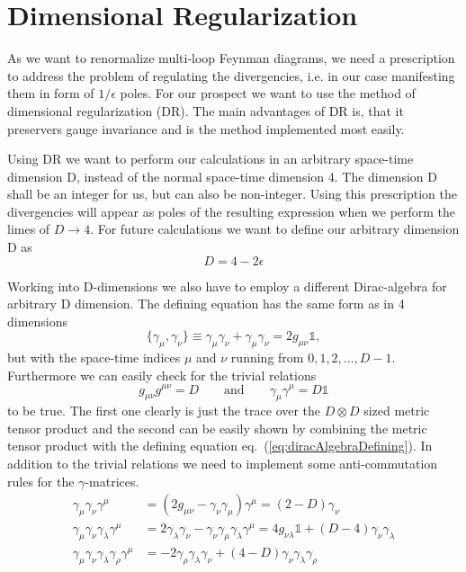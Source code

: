\section{Dimensional Regularization}
As we want to renormalize multi-loop Feynman diagrams, we need a prescription to address the problem of regulating the divergencies, i.e. in our case manifesting them in form of $1/\epsilon$ poles. For our prospect we want to use the method of dimensional regularization (DR). The main advantages of DR is, that it preservers gauge invariance and is the method implemented most easily. 
\par
Using DR we want to perform our calculations in an arbitrary space-time dimension D, instead of the normal space-time dimension 4. The dimension D shall be an integer for us, but can also be non-integer. Using this prescription the divergencies will appear as poles of the resulting expression when we perform the limes of $D \rightarrow 4$. For future calculations we want to define our arbitrary dimension D as 
\begin{equation}
	D = 4 - 2\epsilon
\end{equation}
\par
Working into D-dimensions we also have to employ a different Dirac-algebra for arbitrary D dimension. The defining equation has the same form as in 4 dimensions
\begin{equation}
	\label{eq:diracAlgebraDefining}
	\{ \gamma_\mu, \gamma_\nu \} \equiv \gamma_\mu \gamma_\nu + \gamma_\mu \gamma_\nu = 2 g_{\mu\nu} \mathbb{1},
\end{equation}
but with the space-time indices $\mu$ and $\nu$ running from $0,1,2,\ldots,D-1$. Furthermore we can easily check for the trivial relations
\begin{equation}
	g_{\mu\nu}g^{\mu\nu} = D \qquad \text{and} \qquad \gamma_\mu \gamma^\mu = D \mathbb{1}
\end{equation}
to be true. The first one clearly is just the trace over the $D\otimes D$ sized metric tensor product and the second can be easily shown by combining the metric tensor product with the defining equation eq.~(\ref{eq:diracAlgebraDefining}). In addition to the trivial relations we need to implement some anti-commutation rules for the $\gamma$-matrices.
\begin{align}
	\gamma_\mu\gamma_\nu\gamma^\mu &= (2g_{\mu\nu} - \gamma_\nu \gamma_\mu)\gamma^\mu = (2-D)\gamma_\nu \\
	\gamma_\mu\gamma_\nu\gamma_\lambda\gamma^\mu &= 2\gamma_\lambda \gamma_\nu - \gamma_\nu \gamma_\mu \gamma_\lambda \gamma^\mu = 4g_{\nu\lambda} \mathbb{1} + (D-4)\gamma_\nu\gamma_\lambda \\
	\gamma_\mu\gamma_\nu\gamma_\lambda\gamma_\rho\gamma^\mu &= -2\gamma_\rho\gamma_\lambda\gamma_\nu + (4-D)\gamma_\nu\gamma_\lambda\gamma_\rho	
\end{align}
